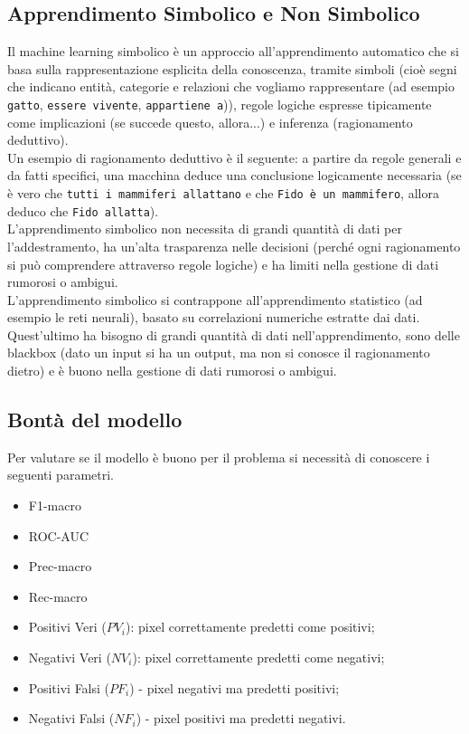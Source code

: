 \subsection{Apprendimento Simbolico e Non Simbolico}
Il machine learning simbolico è un approccio all'apprendimento automatico che si basa sulla rappresentazione esplicita della conoscenza, tramite simboli (cioè segni che indicano entità, categorie e relazioni che vogliamo rappresentare 
(ad esempio \texttt{gatto}, \texttt{essere vivente}, \texttt{appartiene a})), regole logiche espresse tipicamente come implicazioni (se succede questo, allora...) e inferenza (ragionamento deduttivo).\\
Un esempio di ragionamento deduttivo è il seguente:
a partire da regole generali e da fatti specifici, una macchina deduce 
una conclusione logicamente necessaria (se è vero che \texttt{tutti i mammiferi allattano} 
e che \texttt{Fido è un mammifero}, allora deduco che \texttt{Fido allatta}).\\
L'apprendimento simbolico non necessita di grandi quantità di dati per l'addestramento, ha un'alta trasparenza nelle decisioni (perché ogni ragionamento si può comprendere attraverso regole logiche) e ha limiti nella gestione di dati rumorosi o ambigui.\\
L'apprendimento simbolico si contrappone all'apprendimento statistico (ad esempio le reti neurali), 
basato su correlazioni numeriche estratte dai dati. Quest'ultimo ha bisogno di grandi quantità di dati nell'apprendimento, sono delle blackbox (dato un input si ha un output, ma non si conosce il ragionamento dietro) e è buono nella gestione di dati rumorosi o ambigui.

\subsection{Bontà del modello}
Per valutare se il modello è buono per il problema si necessità di conoscere i seguenti parametri.
\begin{itemize}
    \item F1-macro     
    \item ROC-AUC    
    \item Prec-macro    
    \item Rec-macro
\end{itemize}
\begin{itemize}
    \item Positivi Veri ($PV_i$): pixel correttamente predetti come positivi;
    \item Negativi Veri ($NV_i$): pixel correttamente predetti come negativi;
    \item Positivi Falsi ($PF_i$) - pixel negativi ma predetti positivi;
    \item Negativi Falsi ($NF_i$) - pixel positivi ma predetti negativi.
\end{itemize}

